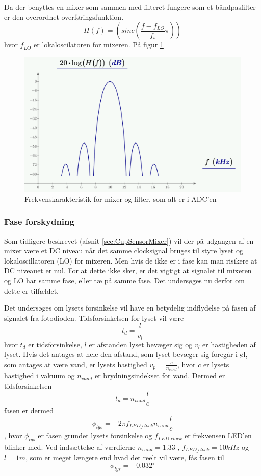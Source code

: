 \documentclass[HardwareDesign/HardwareDesign_main.tex]{subfiles}
\begin{document}
Da der benyttes en mixer som sammen med filteret fungere som et båndpasfilter er den overordnet overføringsfunktion.
$$H(f) = \left(sinc\left( \frac{f - f_{LO}}{f_s}\pi\right)\right)$$
hvor $f_{LO}$ er lokaloscilatoren for mixeren.
På figur \ref{fig:CupSensorFilterResponse}
\begin{figure}[H]
    \centering
    \includegraphics[width=1\textwidth]{HardwareDesign/CupSensor/graphics/Filterresponse.PNG}
    \caption{Frekvenskarakteristik for mixer og filter, som alt er i ADC'en}
    \label{fig:CupSensorFilterResponse}
\end{figure}

\subsubsection{Fase forskydning}
Som tidligere beskrevet (afsnit \ref{sec:CupSensorMixer}) vil der på udgangen af en mixer være et DC niveau når det samme clocksignal bruges til styre lyset og lokaloscillatoren (LO) for mixeren. Men hvis de ikke er i fase kan man risikere at DC niveauet er nul. For at dette ikke sker, er det vigtigt at signalet til mixeren og LO har samme fase, eller tæ på samme fase. Det undersøges nu derfor om dette er tilfældet.

Det undersøges om lysets forsinkelse vil have en betydelig indflydelse på fasen af signalet fra fotodioden. Tidsforsinkelsen for lyset vil være 
$$t_d = \frac{l}{v_l}$$
hvor $t_d$ er tidsforsinkelse, $l$ er afstanden lyset bevæger sig og $v_l$ er hastigheden af lyset. Hvis det antages at hele den afstand, som lyset bevæger sig foregår i øl, som antages at være vand, er lysets hastighed $v_p = \frac{c}{n_{vand}}$, hvor $c$ er lysets hastighed i vakuum og $n_{vand}$ er brydningsindekset for vand.
Dermed er tidsforsinkelsen
$$t_d = n_{vand}\frac{l}{c}$$
fasen er dermed
$$\phi_{lys} = -2 \pi f_{LED\_clock} n_{vand}\frac{l}{c}$$, hvor $\phi_{lys}$ er fasen grundet lysets forsinkelse og $f_{LED\_clock}$ er frekvensen LED'en blinker med. Ved indsættelse af værdierne $n_{vand}=1.33$ \autocite{brydningsindex}, $f_{LED\_clock} = 10kHz$ og $l=1m$, som er meget længere end hvad det reelt vil være, fås fasen til 
$$\phi_{lys} = -0.032 \si{^{\circ}}$$
\end{document}
